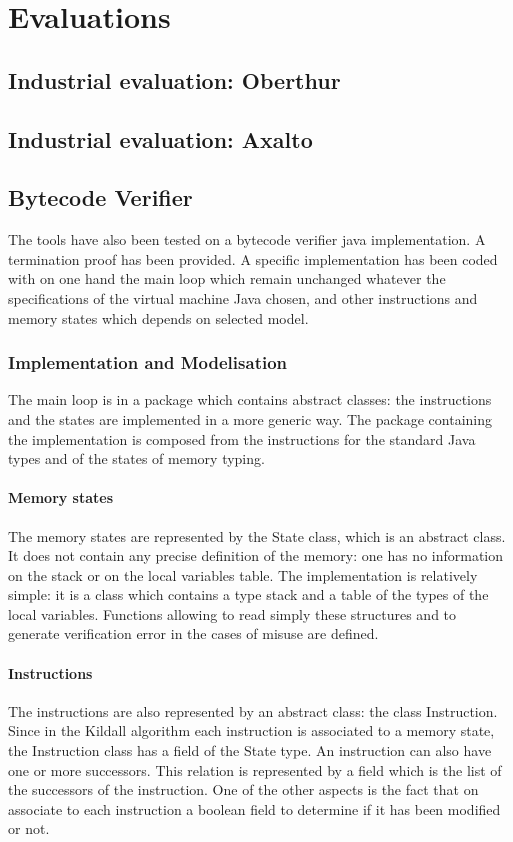 \chapter{Evaluations}
\section{Industrial evaluation: Oberthur}
\section{Industrial evaluation: Axalto}
\section{Bytecode Verifier}
The tools have also been tested on a bytecode verifier java implementation. A termination proof has been provided.
A specific implementation has been coded with on one hand the main loop which remain unchanged whatever the specifications of the virtual machine Java chosen, and other instructions and memory states which depends on selected model.
\subsection{Implementation and Modelisation}
The main loop is in a package which contains abstract classes: 
the instructions and the states are implemented in a more generic way.
The package containing the implementation is composed from the instructions for the standard Java types and of the states of memory typing. 
\subsubsection {Memory states}
The memory states are represented by the State class, which is an abstract class.  It does not contain any precise definition of the memory: 
one has no information on the stack or on the local variables table. 
The implementation is relatively simple: 
it is a class which contains a type stack and a table of the types of the local variables. 
Functions allowing to read simply these structures and to generate verification error in the cases of misuse are defined.   
\subsubsection{Instructions}
The instructions are also represented by an abstract class: 
the class Instruction.  
Since in the Kildall algorithm each instruction is associated to a memory state,  the Instruction class has a field of the State type. 
An instruction can also have one or more successors. 
This relation is represented by a field which is the list of the successors of the instruction.  
One of the other aspects is the fact that on associate to each instruction a boolean field to determine if it has been modified or not.

